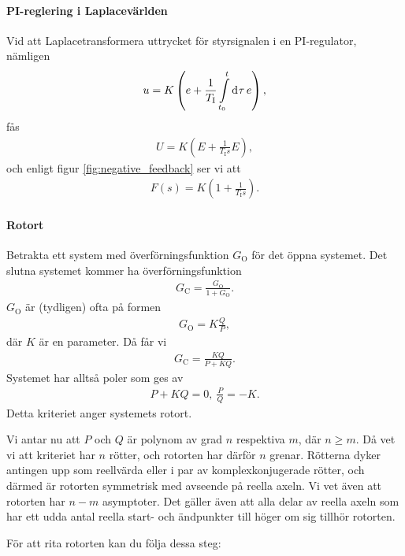 \paragraph{PI-reglering i Laplacevärlden}
Vid att Laplacetransformera uttrycket för styrsignalen i en PI-regulator, nämligen
\begin{align*}
	u = K\left(e + \frac{1}{T_{\text{I}}}\int\limits_{t_{0}}^{t}\dd[]{\tau}e\right),
\end{align*}
fås
\begin{align*}
	U = K\left(E + \frac{1}{T_{\text{I}}s}E\right),
\end{align*}
och enligt figur \ref{fig:negative_feedback} ser vi att
\begin{align*}
	F(s) = K\left(1 + \frac{1}{T_{\text{I}}s}\right).
\end{align*}

\paragraph{Rotort}
Betrakta ett system med överförningsfunktion $G_{\text{O}}$ för det öppna systemet. Det slutna systemet kommer ha överförningsfunktion
\begin{align*}
	G_{\text{C}} = \frac{G_{\text{O}}}{1 + G_{\text{O}}}.
\end{align*}
$G_{\text{O}}$ är (tydligen) ofta på formen
\begin{align*}
	G_{\text{O}} = K\frac{Q}{P},
\end{align*}
där $K$ är en parameter. Då får vi
\begin{align*}
	G_{\text{C}} = \frac{KQ}{P + KQ}.
\end{align*}
Systemet har alltså poler som ges av
\begin{align*}
	P + KQ = 0,\ \frac{P}{Q} = -K.
\end{align*}
Detta kriteriet anger systemets rotort.

Vi antar nu att $P$ och $Q$ är polynom av grad $n$ respektiva $m$, där $n \geq m$. Då vet vi att kriteriet har $n$ rötter, och rotorten har därför $n$ grenar. Rötterna dyker antingen upp som reellvärda eller i par av komplexkonjugerade rötter, och därmed är rotorten symmetrisk med avseende på reella axeln. Vi vet även att rotorten har $n - m$ asymptoter. Det gäller även att alla delar av reella axeln som har ett udda antal reella start- och ändpunkter till höger om sig tillhör rotorten.

För att rita rotorten kan du följa dessa steg:

